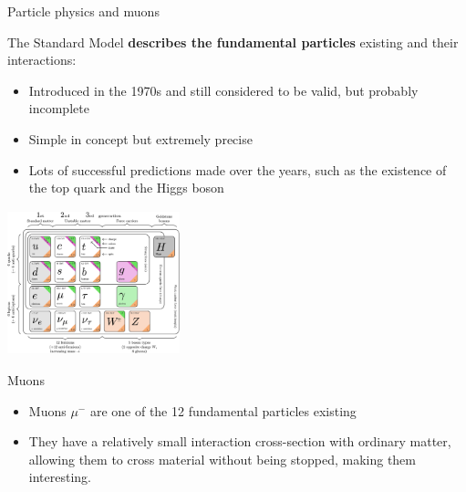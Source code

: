 \documentclass[8 pt]{beamer}
\begin{document}
\begin{frame}{Particle physics and muons}

\begin{minipage}[c]{.54\textwidth}
The Standard Model \textbf{describes the fundamental particles} existing and their interactions:
\begin{itemize}
	\justifying
	\item Introduced in the 1970s and still considered to be valid, but probably incomplete
	\item Simple in concept but extremely precise
	\item Lots of successful predictions made over the years, such as the existence of the top quark and the Higgs boson
\end{itemize}
\end{minipage} \hfill
\begin{minipage}[c]{.42\textwidth}
	\includegraphics[width=5cm, height=4.2cm]{figs/SMFermions.png}
\end{minipage} \hfill \vfill

\begin{exampleblock}{} Muons \end{exampleblock}
\begin{itemize}
	\justifying
	\item Muons $\mu^-$ are one of the 12 fundamental particles existing
	\item They have a relatively small interaction cross-section with ordinary matter, allowing them to cross material without being stopped, making them interesting.
\end{itemize} \vfill
\end{frame}
\end{document}
